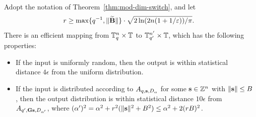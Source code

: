 \begin{lemma}
  \label{lem:reverse-main}
  Adopt the notation of Theorem~\ref{thm:mod-dim-switch}, and let 
\[
	r
  \geq \max\{q^{-1}, \lVert\widetilde{\mathbf{B}}\rVert\} \cdot
  \sqrt{2\ln(2n(1+1/\varepsilon))/\pi}. 
	\]
There is an efficient 
  mapping from $\mathbb{T}_{q}^{n} \times \mathbb{T}$ to $\mathbb{T}_{q'}^{n'} \times \mathbb{T}$, which
  has the following properties:
  \begin{itemize}[itemsep=0pt]
  \item If the input is uniformly random, then the output is within
statistical distance $4 \epsilon$ from the uniform distribution.
  \item If the input is distributed according to
    $A_{q,\mathbf{s},D_{\alpha}}$ for some $\mathbf{s} \in \mathbb{Z}^{n}$ with
    $\lVert\mathbf{s}\rVert \leq B$, then the output distribution is within
    statistical distance $10 \epsilon$ from $A_{q',\mathbf{G}\mathbf{s},D_{\alpha'}}$, where
    $(\alpha')^{2} = \alpha^{2} + r^{2}(\lVert\mathbf{s}\rVert^{2}+B^{2}) \leq
    \alpha^{2} + 2(rB)^{2}$. 
  \end{itemize}
\end{lemma}

